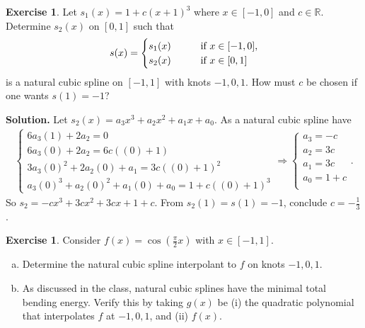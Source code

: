\documentclass[a4paper]{book}
\newenvironment{solution}%
{\noindent\textbf{Solution.}}%
{\qedhere}
\numberwithin{equation}{chapter}
\theoremstyle{definition}
\newtheorem{exc}[exm]{Exercise}
\begin{document}
\begin{exc}
  Let $s_1(x) = 1 + c(x + 1)^3$ where $x \in [-1,0]$ and $c \in \mathbb{R}$. Determine $s_2(x)$ on $[0,1]$ such that
  \begin{align*}
    s(x) =
    \begin{cases}
      s_1(x) \qquad &\textmd{if } x \in [-1,0],\\
      s_2(x) \qquad &\textmd{if } x \in [0,1]
    \end{cases}
  \end{align*}
  is a natural cubic spline on $[-1,1]$ with knots $-1,0,1$. How must $c$ be chosen if one wants $s(1) = -1$?
\end{exc}

\begin{solution}
  Let $s_2(x) = a_3 x^3 + a_2 x^2 + a_1 x + a_0$. As a natural cubic spline have
  \begin{align*}
    \begin{cases}
      6 a_3 (1) + 2 a_2 = 0 \\
      6 a_3 (0) + 2 a_2 = 6 c((0) + 1) \\
      3 a_3 (0)^2 + 2 a_2 (0) + a_1 = 3c((0) + 1)^2 \\
      a_3 (0)^3 + a_2 (0)^2 + a_1 (0) + a_0 = 1 + c((0) + 1)^3
    \end{cases} \Longrightarrow
    \begin{cases}
      a_3 = -c \\
      a_2 = 3c \\
      a_1 = 3c \\
      a_0 =1 + c \\
    \end{cases}.
  \end{align*}
  So $s_2 = -cx^3 + 3cx^2 + 3cx + 1+c$. From $s_2(1) = s(1) = -1$, conclude $c = -\frac{1}{3}$.
\end{solution}


\begin{exc}
  Consider $f(x) = \cos(\frac{\pi}{2}x)$ with $x \in [-1,1]$.
  \begin{enumerate} [(a)]
  \item Determine the natural cubic spline interpolant to $f$ on knots $-1,0,1$.

  \item As discussed in the class, natural cubic splines have the minimal total bending energy. Verify this by taking $g(x)$ be (i) the quadratic polynomial that interpolates $f$ at $-1,0,1$, and (ii) $f(x)$.
    
  \end{enumerate}
\end{exc}
\end{document}
